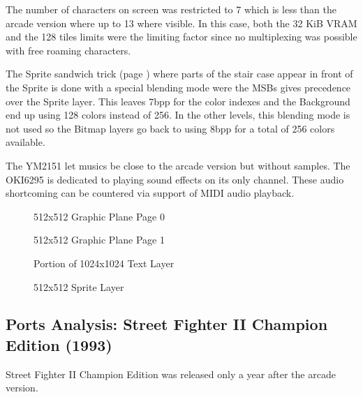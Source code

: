 The number of characters on screen was restricted to 7 which is less than the arcade version where up to 13 where visible. In this case, both the 32 KiB VRAM and the 128 tiles limits were the limiting factor since no multiplexing was possible with free roaming characters.

The Sprite sandwich trick (page \pageref{finalfight_trick}) where parts of the stair case appear in front of the Sprite is done with a special blending mode were the MSBs gives precedence over the Sprite layer. This leaves 7bpp for the color indexes and the Background end up using 128 colors instead of 256. In the other levels, this blending mode is not used so the Bitmap layers go back to using 8bpp for a total of 256 colors available.

The YM2151 let musics be close to the arcade version but without samples. The OKI6295 is dedicated to playing sound effects on its only channel. These audio shortcoming can be countered via support of MIDI audio playback.

\vspace{-4ex}
\begin{minipage}[t]{0.49\linewidth}
  \begin{figure}[H]
  \caption*{512x512 Graphic Plane Page 0}
  \end{figure}
\end{minipage}%
\hfill
\begin{minipage}[t]{0.49\linewidth}
  \begin{figure}[H]
  \caption*{512x512 Graphic Plane Page 1}
  \end{figure}
\end{minipage}%

\begin{minipage}[t]{0.49\linewidth}
  \begin{figure}[H]
  \caption*{Portion of 1024x1024 Text Layer}
  \end{figure}
\end{minipage}%
\hfill
\begin{minipage}[t]{0.49\linewidth}
   \begin{figure}[H]
  \caption*{512x512 Sprite Layer}
  \end{figure}
\end{minipage}%


\pagebreak
\subsection{Ports Analysis: Street Fighter II Champion Edition (1993)}
Street Fighter II Champion Edition was released only a year after the arcade version.

